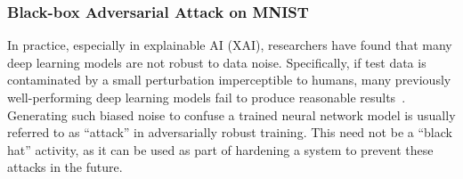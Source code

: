 \documentclass[10pt]{article} %
\numberwithin{equation}{section}
\theoremstyle{plain}
\theoremstyle{definition}
\newcommand{\<}{\langle}
\renewcommand{\>}{\rangle}
\renewcommand{\(}{\left(}
\renewcommand{\)}{\right)}
\renewcommand{\[}{\left[}
\renewcommand{\]}{\right]}
\begin{document}

\subsubsection{Black-box Adversarial Attack on MNIST}
\label{sssec:black-box}

In practice, especially in explainable AI (XAI), researchers have found that many deep learning models are not robust to data noise. Specifically, if test data is contaminated by a small perturbation imperceptible to humans, many previously well-performing deep learning models fail to produce reasonable results~\citep{goodfellow2014explaining}. Generating such biased noise to confuse a trained neural network model is usually referred to as ``attack'' in adversarially robust training. This need not be a ``black hat'' activity, as it can be used as part of hardening a system to prevent these attacks in the future.
\end{document}
